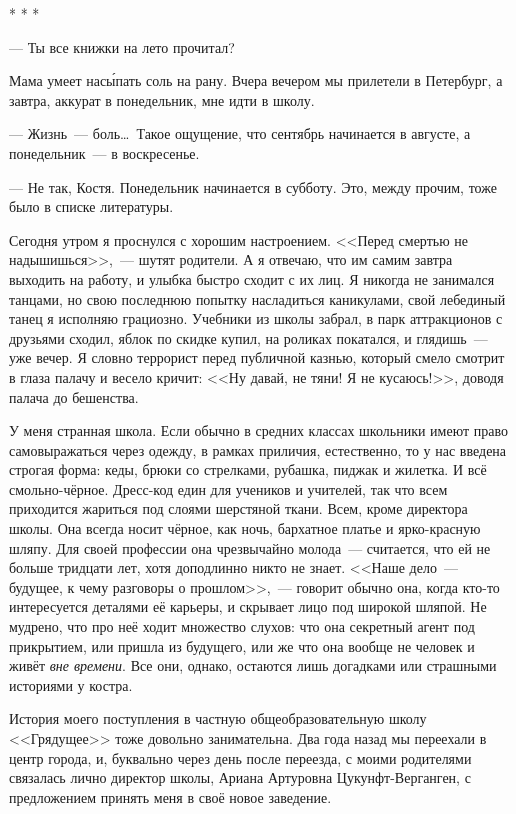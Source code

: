 \documentclass[openany, oneside]{book}
\begin{document}
\begin{center}
    * * *
\end{center}

--- Ты все книжки на лето прочитал?

Мама умеет нас\'{ы}пать соль на рану. Вчера вечером мы прилетели в Петербург, а завтра, аккурат в понедельник, мне идти в школу.

--- Жизнь~--- боль\dots \ Такое ощущение, что сентябрь начинается в августе, а понедельник~--- в воскресенье.

--- Не так, Костя. Понедельник начинается в субботу. Это, между прочим, тоже было в списке литературы.

Сегодня утром я проснулся с хорошим настроением. <<Перед смертью не надышишься>>,~--- шутят родители. А я отвечаю, что им самим завтра выходить на работу, и улыбка быстро сходит с их лиц. Я никогда не занимался танцами, но свою последнюю попытку насладиться каникулами, свой лебединый танец я исполняю грациозно. Учебники из школы забрал, в парк аттракционов с друзьями сходил, яблок по скидке купил, на роликах покатался, и глядишь~--- уже вечер. Я словно террорист перед публичной казнью, который смело смотрит в глаза палачу и весело кричит: <<Ну давай, не тяни! Я не кусаюсь!>>, доводя палача до бешенства.

У меня странная школа. Если обычно в средних классах школьники имеют право самовыражаться через одежду, в рамках приличия, естественно, то у нас введена строгая форма: кеды, брюки со стрелками, рубашка, пиджак и жилетка. И всё смольно-чёрное. Дресс-код един для учеников и учителей, так что всем приходится жариться под слоями шерстяной ткани. Всем, кроме директора школы. Она всегда носит чёрное, как ночь, бархатное платье и ярко-красную шляпу. Для своей профессии она чрезвычайно молода~--- считается, что ей не больше тридцати лет, хотя доподлинно никто не знает. <<Наше дело~--- будущее, к чему разговоры о прошлом>>,~--- говорит обычно она, когда кто-то интересуется деталями её карьеры, и скрывает лицо под широкой шляпой. Не мудрено, что про неё ходит множество слухов: что она секретный агент под прикрытием, или пришла из будущего, или же что она вообще не человек и живёт \textit{вне времени}. Все они, однако, остаются лишь догадками или страшными историями у костра.

История моего поступления в частную общеобразовательную школу <<Грядущее>> тоже довольно занимательна. Два года назад мы переехали в центр города, и, буквально через день после переезда, с моими родителями связалась лично директор школы, Ариана Артуровна Цукунфт-Верганген, с предложением принять меня в своё новое заведение.
\end{document}
